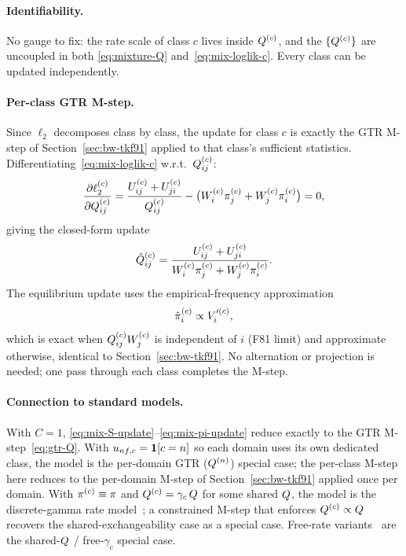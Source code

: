 \paragraph{Identifiability.}
No gauge to fix: the rate scale of class $c$ lives inside
$Q^{(c)}$, and the $\{Q^{(c)}\}$ are uncoupled in both
\eqref{eq:mixture-Q} and~\eqref{eq:mix-loglik-c}.
Every class can be updated independently.

\paragraph{Per-class GTR M-step.}
Since $\ell_2$ decomposes class by class, the update for class $c$ is
exactly the GTR M-step of Section~\ref{sec:bw-tkf91} applied to that
class's sufficient statistics.
Differentiating~\eqref{eq:mix-loglik-c} w.r.t.\ $Q^{(c)}_{ij}$:
\[
\frac{\partial \ell_2^{(c)}}{\partial Q^{(c)}_{ij}}
= \frac{U^{(c)}_{ij}+U^{(c)}_{ji}}{Q^{(c)}_{ij}}
- \bigl(W^{(c)}_i \pi^{(c)}_j + W^{(c)}_j \pi^{(c)}_i\bigr) = 0,
\]
giving the closed-form update
\begin{equation}\label{eq:mix-S-update}
\hat{Q}^{(c)}_{ij}
= \frac{U^{(c)}_{ij} + U^{(c)}_{ji}}
       {W^{(c)}_i \pi^{(c)}_j + W^{(c)}_j \pi^{(c)}_i}.
\end{equation}
The equilibrium update uses the empirical-frequency approximation
\begin{equation}\label{eq:mix-pi-update}
\hat{\pi}^{(c)}_i \propto V'^{(c)}_i,
\end{equation}
which is exact when $Q^{(c)}_{ij} W^{(c)}_j$ is independent of
$i$ (F81 limit) and approximate otherwise, identical to
Section~\ref{sec:bw-tkf91}.
No alternation or projection is needed; one pass through each class
completes the M-step.

\paragraph{Connection to standard models.}
With $C=1$, \eqref{eq:mix-S-update}--\eqref{eq:mix-pi-update} reduce
exactly to the GTR M-step~\eqref{eq:gtr-Q}.
With $u_{nf,c} = \mathbf{1}[c=n]$ so each domain
uses its own dedicated class, the model is the per-domain GTR
($Q^{(n)}$) special case; the per-class M-step here reduces to
the per-domain M-step of Section~\ref{sec:bw-tkf91} applied once per
domain.
With $\pi^{(c)} \equiv \pi$ and $Q^{(c)} = \gamma_c\,Q$ for
some shared $Q$, the model is the discrete-gamma rate
model~\cite{Yang1994a}; a constrained M-step that enforces
$Q^{(c)} \propto Q$ recovers the shared-exchangeability case
as a special case.
Free-rate variants~\cite{Susko2018} are the shared-$Q$ /
free-$\gamma_c$ special case.

